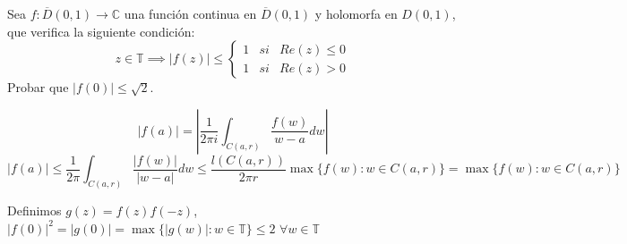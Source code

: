 \begin{ejer}
	Sea $f:\overline{D}(0,1)\rightarrow\mathbb{C}$ una función continua en $\overline{D}(0,1)$ y holomorfa en $D(0,1)$, que verifica la siguiente condición:
	$$ z\in\mathbb{T} \implies |f(z)| \leq \left\{ \begin{array}{lcc}
	1 &  si  & Re(z) \leq 0 \\
	1 &  si  & Re(z) > 0
	\end{array}
	\right. $$
	Probar que $|f(0)| \leq \sqrt{2}$.
\end{ejer}
\begin{sol}
$$|f(a)| = \left| \frac{1}{2\pi i}\int_{C(a,r)} \frac{f(w)}{w-a} dw \right|$$
$$|f(a)| \leq \frac{1}{2\pi} \int_{C(a,r)} \frac{|f(w)|}{|w-a|} dw \leq \frac{l(C(a,r))}{2\pi r} \max\{ f(w) : w\in C(a,r) \} = \max\{ f(w) : w\in C(a,r) \} $$

Definimos $g(z) = f(z)f(-z)$, 
$|f(0)|^2 = |g(0)| = \max\{ |g(w)| : w\in\mathbb{T} \} \leq 2$ $\forall w\in\mathbb{T}$
\end{sol}


